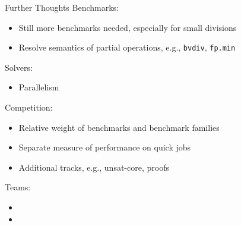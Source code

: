 \documentclass{beamer}
\begin{document}
\begin{frame}{Further Thoughts}
  Benchmarks:
  \begin{itemize}
  \item Still more benchmarks needed, especially for small divisions
  \item Resolve semantics of partial operations, e.g., {\tt bvdiv},
    {\tt fp.min}
  \end{itemize}

  \medskip

  Solvers:
  \begin{itemize}
  \item Parallelism
  \end{itemize}

  \medskip

  Competition:
  \begin{itemize}
  \item Relative weight of benchmarks and benchmark families
  \item Separate measure of performance on quick jobs
  \item Additional tracks, e.g., unsat-core, proofs
  \end{itemize}

  \medskip

  Teams:
  \begin{itemize}
  \item {}
  \item {}
  \end{itemize}
\end{frame}

\end{document}
